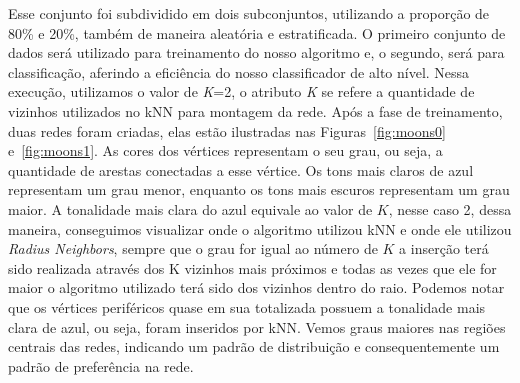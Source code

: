 \documentclass[
12pt,        %
oneside,     %
a4paper,     %
english,       %
brazil        %
%
%
]{ppgca}
\begin{document}
Esse conjunto foi subdividido em dois subconjuntos, utilizando a proporção de 80\% e 20\%, também de maneira aleatória e estratificada. O primeiro conjunto de dados será utilizado para treinamento do nosso algoritmo e, o segundo, será para classificação, aferindo a eficiência do nosso classificador de alto nível. Nessa execução, utilizamos o valor de \textit{K}=2, o atributo \textit{K} se refere a quantidade de vizinhos utilizados no kNN para montagem da rede. Após a fase de treinamento, duas redes foram criadas, elas estão ilustradas nas Figuras~\ref{fig:moons0} e~\ref{fig:moons1}. As cores dos vértices representam o seu grau, ou seja, a quantidade de arestas conectadas a esse vértice. Os tons mais claros de azul representam um grau menor, enquanto os tons mais escuros representam um grau maior. A tonalidade mais clara do azul equivale ao valor de $K$, nesse caso 2, dessa maneira, conseguimos visualizar onde o algoritmo utilizou kNN e onde ele utilizou \textit{Radius Neighbors}, sempre que o grau for igual ao número de $K$ a inserção terá sido realizada através dos K vizinhos mais próximos e todas as vezes que ele for maior o algoritmo utilizado terá sido dos vizinhos dentro do raio. Podemos notar que os vértices periféricos quase em sua totalizada possuem a tonalidade mais clara de azul, ou seja, foram inseridos por kNN. Vemos graus maiores nas regiões centrais das redes, indicando um padrão de distribuição e consequentemente um padrão de preferência na rede.
\end{document}
